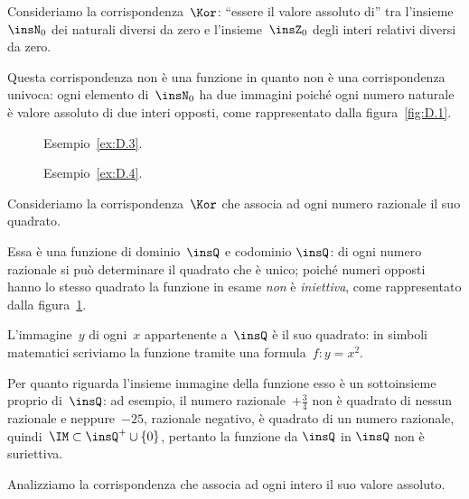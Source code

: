 \begin{exrig}
 \begin{esempio}
 \label{ex:D.3}
Consideriamo la corrispondenza~$\Kor$: ``essere il valore assoluto di'' tra l'insieme~$\insN_0$ dei naturali diversi da zero e l'insieme~$\insZ_0$ degli interi
relativi diversi da zero.

Questa corrispondenza non è una
funzione in quanto non è una corrispondenza univoca: ogni elemento di~$\insN_0$ ha due immagini
poiché ogni numero naturale è valore assoluto di due interi
opposti, come rappresentato dalla figura~\ref{fig:D.1}.
\end{esempio}

\begin{figure}[b]
 \begin{minipage}[t]{.45\textwidth}
\centering
 
\caption{Esempio~\ref{ex:D.3}.}\label{fig:D.1}
 \end{minipage}\hfil
 \begin{minipage}[t]{.45\textwidth}
\centering
 
\caption{Esempio~\ref{ex:D.4}.}\label{fig:D.2}
 \end{minipage}
\end{figure}

 \begin{esempio}
 \label{ex:D.4}
 Consideriamo la corrispondenza~$\Kor$ che associa ad ogni numero razionale il suo quadrato.

Essa è una funzione di
dominio~$\insQ$ e codominio $\insQ$: di ogni numero razionale si può
determinare il quadrato che è unico; poiché numeri opposti hanno lo
stesso quadrato la funzione in esame \emph{non} è
\emph{iniettiva}, come rappresentato dalla figura~\ref{fig:D.2}.

L'immagine~$y$ di ogni~$x$ appartenente a~$\insQ$ è il suo
quadrato: in simboli matematici scriviamo la funzione tramite una
formula~$f: y = x^{2}$.

Per quanto riguarda l'insieme immagine
della funzione esso è un sottoinsieme proprio di~$\insQ$: ad esempio, il numero razionale~$+{\frac{3}{4}}$ non è quadrato di
nessun razionale e neppure~$-25$, razionale negativo, è quadrato di
un numero razionale, quindi~$\IM\subset\insQ^{+}\cup\{0\}$, pertanto la funzione da $\insQ$ in $\insQ$ non è suriettiva.
 \end{esempio}

 \begin{esempio}
 \label{ex:D.5}
 Analizziamo la corrispondenza che associa ad ogni intero il suo valore assoluto.


\end{esempio}
\end{exrig}
